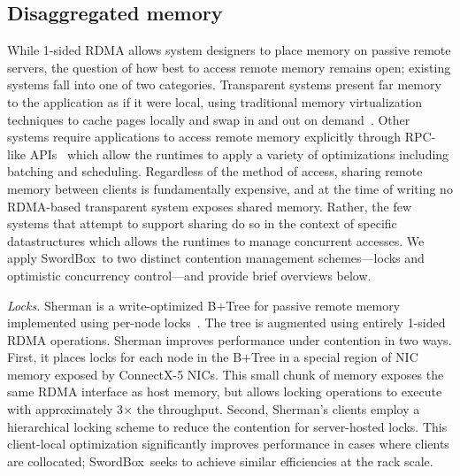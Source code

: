 \documentclass[12pt]{ucsddissertation}
\newcommand{\sword}{SwordBox}
\begin{document}



\subsection{Disaggregated memory}

While 1-sided RDMA allows system designers to place memory on passive
remote servers, the question of how best to access remote memory
remains open; existing systems fall into one of two categories.
Transparent systems present far memory to the application as if it
were local, using traditional memory virtualization techniques to
cache pages locally and swap in and out on
demand~\cite{ivy,infiniswap, leap, fastswap,legoos}.
Other systems require applications to access remote memory explicitly
through RPC-like APIs~\cite{aifm,reigons,clover,sherman,fasst,fusee} which
allow the runtimes to apply a variety of optimizations including
batching and scheduling.
Regardless of the method of access, sharing remote memory between
clients is fundamentally expensive, and at the time of writing no
RDMA-based transparent system exposes shared memory.  Rather, the few
systems that attempt to support sharing do so in the context of
specific datastructures which allows the runtimes to manage concurrent
accesses.  We apply \sword\ to two distinct
contention management schemes---locks and optimistic concurrency
control---and provide brief overviews below.

\emph{Locks.}  Sherman is a write-optimized B+Tree for passive remote
memory implemented using per-node locks~\cite{sherman}. The tree is
augmented using entirely 1-sided RDMA operations. Sherman improves
performance under contention in two ways. First, it places locks for
each node in the B+Tree in a special region of NIC memory exposed by
ConnectX-5 NICs.  This small chunk of memory exposes the same RDMA
interface as host memory, but allows locking operations to execute
with approximately 3$\times$ the throughput.  Second, Sherman's
clients employ a hierarchical locking scheme to reduce the contention
for server-hosted locks.  This client-local optimization significantly
improves performance in cases where clients are collocated;
\sword\ seeks to achieve similar efficiencies at the rack scale.
\end{document}
